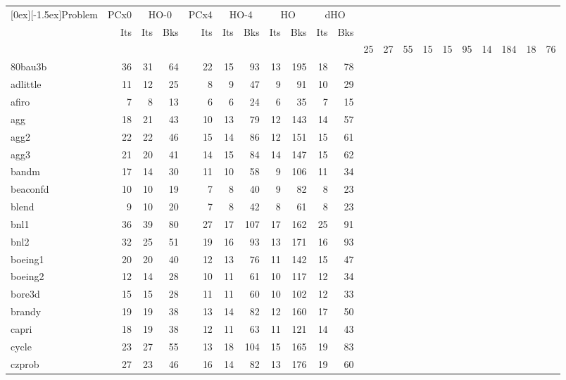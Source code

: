 \begin{small}
\begin{longtable}{|l|r|rr||r|rr||rr||rr|} \hline 
\raisebox{-1.5ex}[0ex][-1.5ex]{Problem} & \multicolumn{1}{c|}{PCx0}
        & \multicolumn{2}{c||}{HO-0}
        & \multicolumn{1}{c|}{PCx4} 
        & \multicolumn{2}{c||}{HO-4} 
        & \multicolumn{2}{c||}{HO\raisebox{1pt}{-$\infty$}} 
        & \multicolumn{2}{c|}{dHO} \\ \cline{2-11}
        & Its
        & Its & Bks
        & Its
        & Its & Bks
        & Its & Bks
        & Its & Bks \\ \hline
\endhead
\hline
\multicolumn{11}{c}{\raisebox{-1ex}{Table~\ref{MLresults}: Comparison with Mehrotra and Li's algorithm.}}
\endfoot
\label{MLresults}
25fv47 & 25 & 27 & 55 & 15 & 15 & 95 & 14 & 184 & 18 & 76 \\
80bau3b & 36 & 31 & 64  & 22 & 15 & 93 & 13 & 195 & 18 & 78 \\
adlittle & 11 & 12 & 25  & 8 & 9 & 47 & 9 & 91 & 10 & 29 \\
afiro & 7 & 8 & 13  & 6 & 6 & 24 & 6 & 35 & 7 & 15 \\
agg & 18 & 21 & 43  & 10 & 13 & 79 & 12 & 143 & 14 & 57 \\
agg2 & 22 & 22 & 46  & 15 & 14 & 86 & 12 & 151 & 15 & 61 \\
agg3 & 21 & 20 & 41  & 14 & 15 & 84 & 14 & 147 & 15 & 62 \\
bandm & 17 & 14 & 30  & 11 & 10 & 58 & 9 & 106 & 11 & 34 \\
beaconfd & 10 & 10 & 19  & 7 & 8 & 40 & 9 & 82 & 8 & 23 \\
blend & 9 & 10 & 20  & 7 & 8 & 42 & 8 & 61 & 8 & 23 \\
bnl1 & 36 & 39 & 80  & 27 & 17 & 107 & 17 & 162 & 25 & 91 \\
bnl2 & 32 & 25 & 51  & 19 & 16 & 93 & 13 & 171 & 16 & 93 \\
boeing1 & 20 & 20 & 40  & 12 & 13 & 76 & 11 & 142 & 15 & 47 \\
boeing2 & 12 & 14 & 28  & 10 & 11 & 61 & 10 & 117 & 12 & 34 \\
bore3d & 15 & 15 & 28  & 11 & 11 & 60 & 10 & 102 & 12 & 33 \\
brandy & 19 & 19 & 38  & 13 & 14 & 82 & 12 & 160 & 17 & 50 \\
capri & 18 & 19 & 38  & 12 & 11 & 63 & 11 & 121 & 14 & 43 \\
cycle & 23 & 27 & 55  & 13 & 18 & 104 & 15 & 165 & 19 & 83 \\
czprob & 27 & 23 & 46  & 16 & 14 & 82 & 13 & 176 & 19 & 60 \\

\end{longtable}
\end{small}

